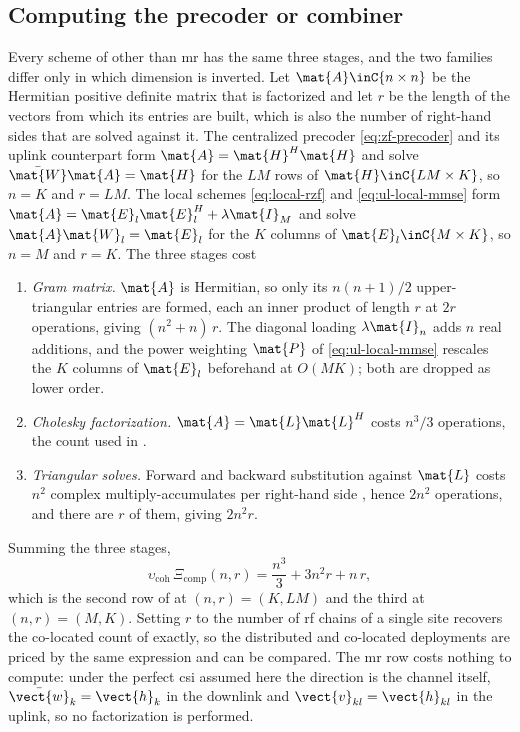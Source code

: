 \subsection{Computing the precoder or combiner}
Every scheme of  other than \gls{mr} has the same three
stages, and the two families differ only in which dimension is inverted. Let
$\mat{A}\inC{n\times n}$ be the Hermitian positive definite matrix that is
factorized and let $r$ be the length of the vectors from which its entries are
built, which is also the number of right-hand sides that are solved against it.
The centralized precoder \eqref{eq:zf-precoder} and its uplink counterpart form
$\mat{A}=\mat{H}^{H}\mat{H}$ and solve $\bar{\mat{W}}\mat{A}=\mat{H}$ for the
$LM$ rows of $\mat{H}\inC{LM\times K}$, so $n=K$ and $r=LM$. The local schemes
\eqref{eq:local-rzf} and \eqref{eq:ul-local-mmse} form
$\mat{A}=\mat{E}_{l}\mat{E}_{l}^{H}+\lambda\mat{I}_{M}$ and solve
$\mat{A}\mat{W}_{l}=\mat{E}_{l}$ for the $K$ columns of
$\mat{E}_{l}\inC{M\times K}$, so $n=M$ and $r=K$. The three stages cost
\begin{enumerate}
\item \emph{Gram matrix.} $\mat{A}$ is Hermitian, so only its $n(n+1)/2$
upper-triangular entries are formed, each an inner product of length $r$ at $2r$
operations, giving $(n^{2}+n)\,r$. The diagonal loading $\lambda\mat{I}_{n}$ adds
$n$ real additions, and the power weighting $\mat{P}$ of
\eqref{eq:ul-local-mmse} rescales the $K$ columns of $\mat{E}_{l}$ beforehand at
$O(MK)$; both are dropped as lower order.
\item \emph{Cholesky factorization.} $\mat{A}=\mat{L}\mat{L}^{H}$ costs
$n^{3}/3$ operations, the count used in \cite{peschiera2026fr3}.
\item \emph{Triangular solves.} Forward and backward substitution against
$\mat{L}$ costs $n^{2}$ complex multiply-accumulates per right-hand side
\cite[App.~B.1.1]{massivemimobook}, hence $2n^{2}$ operations, and there are
$r$ of them, giving $2n^{2}r$.
\end{enumerate}
Summing the three stages,
\begin{equation}
\label{eq:app_chol}
\upsilon_{\mathrm{coh}}\,\Xi_{\mathrm{comp}}(n,r) =
\frac{n^{3}}{3} + 3n^{2}r + n\,r ,
\end{equation}
which is the second row of  at $(n,r)=(K,LM)$ and the third
at $(n,r)=(M,K)$. Setting $r$ to the number of \gls{rf} chains of a single site
recovers the co-located count of \cite{peschiera2026fr3} exactly, so the
distributed and co-located deployments are priced by the same expression and can
be compared. The \gls{mr} row costs nothing to compute: under the perfect
\gls{csi} assumed here the direction is the channel itself,
$\bar{\vect{w}}_{k}=\vect{h}_{k}$ in the downlink and
$\vect{v}_{kl}=\vect{h}_{kl}$ in the uplink, so no factorization is performed.

